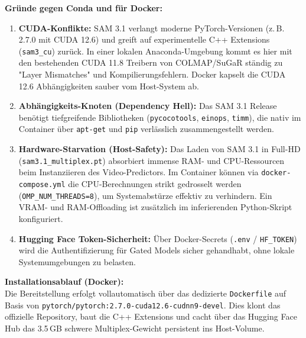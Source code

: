 \documentclass[12pt,a4paper]{article}
\begin{document}
\textbf{Gründe gegen Conda und für Docker:}
\begin{enumerate}[noitemsep]
    \item \textbf{CUDA-Konflikte:} SAM 3.1 verlangt moderne PyTorch-Versionen (z.\,B. 2.7.0 mit CUDA 12.6) und greift auf experimentelle C++ Extensions (\texttt{sam3\_cu}) zurück. In einer lokalen Anaconda-Umgebung kommt es hier mit den bestehenden CUDA 11.8 Treibern von COLMAP/SuGaR ständig zu "Layer Mismatches" und Kompilierungsfehlern. Docker kapselt die CUDA 12.6 Abhängigkeiten sauber vom Host-System ab.
    \item \textbf{Abhängigkeits-Knoten (Dependency Hell):} Das SAM 3.1 Release benötigt tiefgreifende Bibliotheken (\texttt{pycocotools}, \texttt{einops}, \texttt{timm}), die nativ im Container über \texttt{apt-get} und \texttt{pip} verlässlich zusammengestellt werden.
    \item \textbf{Hardware-Starvation (Host-Safety):} Das Laden von SAM 3.1 in Full-HD (\texttt{sam3.1\_multiplex.pt}) absorbiert immense RAM- und CPU-Ressourcen beim Instanziieren des Video-Predictors. Im Container können via \texttt{docker-compose.yml} die CPU-Berechnungen strikt gedrosselt werden (\texttt{OMP\_NUM\_THREADS=8}), um Systemabstürze effektiv zu verhindern. Ein VRAM- und RAM-Offloading ist zusätzlich im inferierenden Python-Skript konfiguriert.
    \item \textbf{Hugging Face Token-Sicherheit:} Über Docker-Secrets (\texttt{.env} / \texttt{HF\_TOKEN}) wird die Authentifizierung für Gated Models sicher gehandhabt, ohne lokale Systemumgebungen zu belasten.
\end{enumerate}

\textbf{Installationsablauf (Docker):}\\
Die Bereitstellung erfolgt vollautomatisch über das dedizierte \texttt{Dockerfile} auf Basis von \texttt{pytorch/pytorch:2.7.0-cuda12.6-cudnn9-devel}. Dies klont das offizielle Repository, baut die C++ Extensions und cacht über das Hugging Face Hub das 3.5\,GB schwere Multiplex-Gewicht persistent ins Host-Volume.
\end{document}
